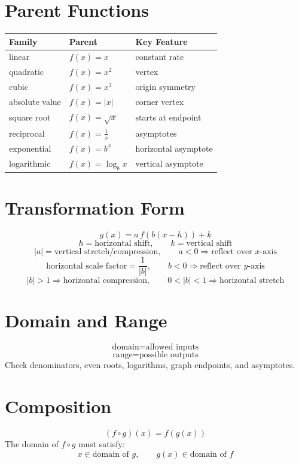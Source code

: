 \documentclass[11pt]{article}
\begin{document}

\section*{Parent Functions}
\begin{center}
\begin{tabular}{lll}
\toprule
Family & Parent & Key Feature \\
\midrule
linear & $f(x)=x$ & constant rate \\
quadratic & $f(x)=x^2$ & vertex \\
cubic & $f(x)=x^3$ & origin symmetry \\
absolute value & $f(x)=|x|$ & corner vertex \\
square root & $f(x)=\sqrt x$ & starts at endpoint \\
reciprocal & $f(x)=\frac1x$ & asymptotes \\
exponential & $f(x)=b^x$ & horizontal asymptote \\
logarithmic & $f(x)=\log_b x$ & vertical asymptote \\
\bottomrule
\end{tabular}
\end{center}

\section*{Transformation Form}
\[
g(x)=a\,f(b(x-h))+k
\]
\[
h=\text{horizontal shift},\qquad k=\text{vertical shift}
\]
\[
|a|=\text{vertical stretch/compression},\qquad a<0\Rightarrow \text{reflect over }x\text{-axis}
\]
\[
\text{horizontal scale factor}=\frac1{|b|},\qquad b<0\Rightarrow \text{reflect over }y\text{-axis}
\]
\[
|b|>1\Rightarrow \text{horizontal compression},\qquad 0<|b|<1\Rightarrow \text{horizontal stretch}
\]

\section*{Domain and Range}
\[
\text{domain}=\text{allowed inputs}
\]
\[
\text{range}=\text{possible outputs}
\]
Check denominators, even roots, logarithms, graph endpoints, and asymptotes.

\section*{Composition}
\[
(f\circ g)(x)=f(g(x))
\]
The domain of $f\circ g$ must satisfy:
\[
x\in \text{domain of }g,\qquad g(x)\in \text{domain of }f
\]
\end{document}
